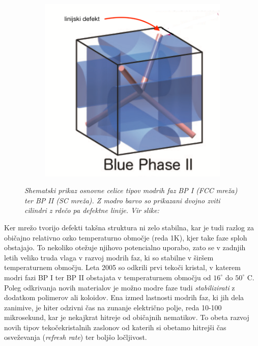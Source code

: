 \documentclass[longbibliography,slovene,a4paper,12pt]{book}
\begin{document}
\begin{figure}[h!]
\begin{subfigure}[b]{0.45\textwidth}
	\includegraphics[width=\textwidth]{slike/bp_II.png}
	\label{fig:bp2}
	\end{subfigure}
	\caption{\emph{Shematski prikaz osnovne celice tipov modrih faz BP I (FCC mreža) ter BP II (SC mreža). Z modro barvo so prikazani dvojno zviti cilindri z rdečo pa defektne linije. Vir slike: }}
\end{figure}

Ker mrežo tvorijo defekti takšna struktura ni zelo stabilna, kar je tudi razlog za običajno relativno ozko temperaturno območje (reda 1K), kjer take faze sploh obstajajo. To nekoliko otežuje njihovo potencialno uporabo, zato se v zadnjih letih veliko truda vlaga v razvoj modrih faz, ki so stabilne v širšem temperaturnem območju. Leta 2005 so odkrili prvi tekoči kristal, v katerem modri fazi BP I ter BP II obstajata v temperaturnem območju od $16^\circ$ do $50^\circ$ C\cite{coles}. Poleg odkrivanja novih materialov je možno modre faze tudi \emph{stabilizirati} z dodatkom polimerov ali koloidov\cite{kikuchi,ravnik2, ravnik3}. Ena izmed lastnosti modrih faz, ki jih dela zanimive, je hiter odzivni čas na zunanje električno polje, reda 10-100 mikrosekund, kar je nekajkrat hitreje od običajnih nematikov. To obeta razvoj novih tipov tekočekristalnih zaslonov od katerih si obetamo hitrejši čas osveževanja (\emph{refresh rate}) ter boljšo ločljivost\cite{kikuchi2}.
\end{document}
